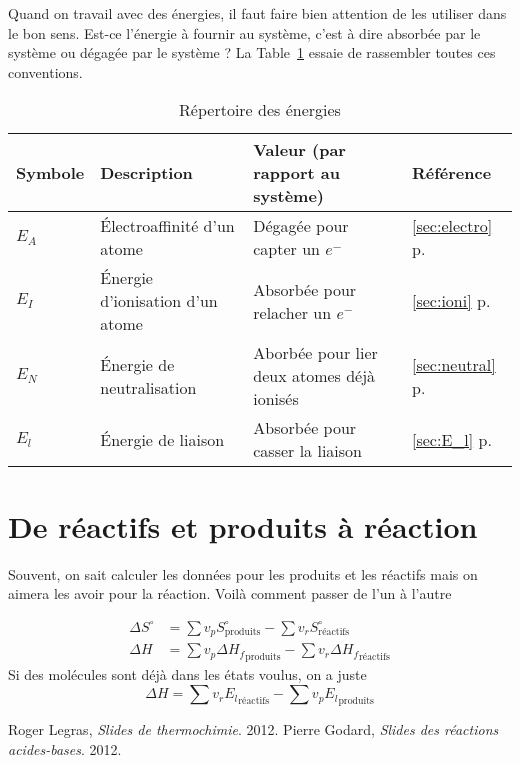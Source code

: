Quand on travail avec des énergies, il faut faire bien attention de les utiliser dans le bon sens.
Est-ce l'énergie à fournir au système, c'est à dire absorbée par le système ou dégagée par le système ?
La Table~\ref{tab:energies} essaie de rassembler toutes ces conventions.

\begin{table}[h!]
	\begin{center}
		\begin{tabular}{|p{}|p{}|p{}|p{}|}
			\hline
			Symbole & Description & Valeur (par rapport au système) & Référence\\
			\hline
			$E_A$ & \'Electroaffinité d'un atome & Dégagée pour capter un $e^-$ & \ref{sec:electro} p.~\pageref{sec:electro}\\
			$E_I$ & \'Energie d'ionisation d'un atome & Absorbée pour relacher un $e^-$ & \ref{sec:ioni} p.~\pageref{sec:ioni}\\
			$E_N$ & \'Energie de neutralisation & Aborbée pour lier deux atomes déjà ionisés & \ref{sec:neutral} p.~\pageref{sec:neutral}\\
			$E_l$ & \'Energie de liaison & Absorbée pour casser la liaison & \ref{sec:E_l} p.~\pageref{sec:E_l}\\ %
			\hline
		\end{tabular}
		\caption{Répertoire des énergies}
		\label{tab:energies}
	\end{center}
\end{table}

\section{De réactifs et produits à réaction}
Souvent, on sait calculer les données pour les produits et les réactifs mais on aimera les avoir pour la réaction.
Voilà comment passer de l'un à l'autre

\begin{align*}
	\Delta S^{\circ} &= \sum v_p S^{\circ}_\mathrm{produits} - \sum v_r S^{\circ}_\mathrm{réactifs}\\
	\Delta H &= \sum v_p \Delta {H_f}_\mathrm{produits} - \sum v_r \Delta {H_f}_\mathrm{réactifs}
\end{align*}
Si des molécules sont déjà dans les états voulus, on a juste
\[ \Delta H = \sum v_r{E_l}_\mathrm{réactifs} - \sum v_p{E_l}_\mathrm{produits} \]

\begin{thebibliography}{9}
		Roger Legras,
		\emph{Slides de thermochimie}.
		2012.
		Pierre Godard,
		\emph{Slides des réactions acides-bases}.
		2012.
\end{thebibliography}

